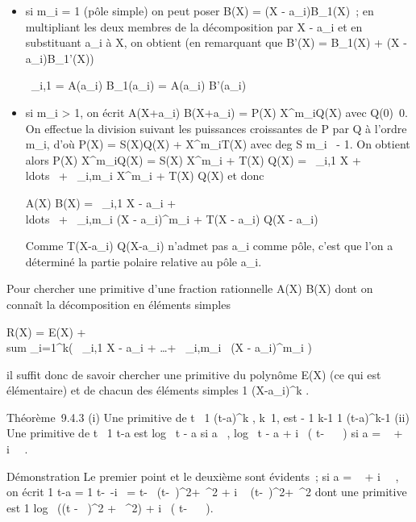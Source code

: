 \documentclass[]{article}
\begin{document}
\begin{itemize}
\item
  si m\_i = 1 (pôle simple) on peut poser B(X) = (X -
  a\_i)B\_1(X)~; en multipliant les deux membres de la
  décomposition par X - a\_i et en substituant a\_i à X,
  on obtient (en remarquant que B'(X) = B\_1(X) + (X -
  a\_i)B\_1'(X))

  \alpha~\_i,1 = A(a\_i) \over
  B\_1(a\_i) = A(a\_i) \over
  B'(a\_i)
\item
  si m\_i \textgreater{} 1, on écrit  A(X+a\_i)
  \over B(X+a\_i) = P(X) \over
  X^m\_iQ(X) avec
  Q(0)\neq~0. On effectue la division suivant les
  puissances croissantes de P par Q à l'ordre m\_i, d'où P(X) =
  S(X)Q(X) + X^m\_iT(X) avec
  deg S \leq m\_i~ - 1. On obtient alors
   P(X) \over X^m\_iQ(X) = S(X)
  \over X^m\_i + T(X)
  \over Q(X) = \alpha~\_i,1 \over
  X + \\ldots~ +
  \alpha~\_i,m\_i \over
  X^m\_i + T(X) \over Q(X) et
  donc

   A(X) \over B(X) = \alpha~\_i,1
  \over X - a\_i +
  \\ldots~ +
  \alpha~\_i,m\_i \over (X -
  a\_i)^m\_i + T(X - a\_i)
  \over Q(X - a\_i)

  Comme  T(X-a\_i) \over Q(X-a\_i)
  n'admet pas a\_i comme pôle, c'est que l'on a déterminé la
  partie polaire relative au pôle a\_i.
\end{itemize}

Pour chercher une primitive d'une fraction rationnelle  A(X)
\over B(X) dont on connaît la décomposition en éléments
simples

R(X) = E(X) + \\sum
\_i=1^k\left ( \alpha~\_i,1
\over X - a\_i +
\ldots + \alpha~\_i,m\_i~
\over (X - a\_i)^m\_i
\right )

il suffit donc de savoir chercher une primitive du polynôme E(X) (ce qui
est élémentaire) et de chacun des éléments simples  1
\over (X-a\_i)^k .

Théorème~9.4.3 (i) Une primitive de t\mapsto~ 1
\over (t-a)^k ,
k\neq~1, est - 1 \over k-1 
1 \over (t-a)^k-1 (ii) Une primitive de
t\mapsto~ 1 \over t-a est
log~ \textbar{}t - a\textbar{} si a \in {}~,
log~ \textbar{}t - a\textbar{} +
i\mathrmarctg~ ( t-\alpha~
\over \beta~ ) si a = \alpha~ + i\beta~ \in {} \diagdown {}~.

Démonstration Le premier point et le deuxième sont évidents~; si a = \alpha~ +
i\beta~ \in {} \diagdown {}~, on écrit  1 \over t-a = 1
\over t-\alpha~-i\beta~ = t-\alpha~ \over
(t-\alpha~)^2+\beta~^2 + i \beta~ \over
(t-\alpha~)^2+\beta~^2 dont une primitive est  1
  log~ ((t -
\alpha~)^2 + \beta~^2) +
i\mathrmarctg~ ( t-\alpha~
\over \beta~ ).
\end{document}
